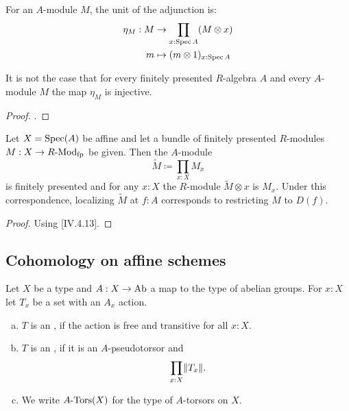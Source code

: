 For an $A$-module $M$,
the unit of the adjunction is:
\begin{align*}
  \eta_M : M &\to \prod_{x : \operatorname{Spec} A} (M \otimes x) \\
  m &\mapsto (m \otimes 1)_{x : \operatorname{Spec} A}
\end{align*}

\begin{example}
  It is not the case that
  for every finitely presented $R$-algebra $A$
  and every $A$-module $M$
  the map $\eta_M$ is injective.
\end{example}

\begin{proof}
  \cite{topology-draft}.
\end{proof}

\begin{theorem}%
  \label{fp-module}
  Let $X=\operatorname{Spec}(A)$ be affine and
  let a bundle of finitely presented $R$-modules $M : X\to R\text{-}\mathrm{Mod}_{\text{fp}}$ be given.
  Then the $A$-module
  \[ \tilde{M}\coloneqq\prod_{x:X}M_x \]
  is finitely presented and for any $x:X$ the $R$-module $\tilde{M}\otimes x$ is $M_x$.
  Under this correspondence, localizing $\tilde{M}$ at $f:A$ corresponds to restricting $M$ to $D(f)$.
\end{theorem}

\begin{proof}
  Using \cite{lombardi-quitte}[IV.4.13].
\end{proof}

\subsection{Cohomology on affine schemes}

\begin{definition}%
  \label{torsor}
  Let $X$ be a type and $A:X\to \operatorname{Ab}$ a map to the type of abelian groups.
  For $x:X$ let $T_x$ be a set with an $A_x$ action.
  \begin{enumerate}[(a)]
  \item $T$ is an , if the action is free and transitive for all $x:X$.
  \item $T$ is an , if it is an $A$-pseudotorsor and
    \[ \prod_{x:X} \propTrunc{ T_x } \rlap{.}\]
  \item We write $A\text{-}\mathrm{Tors}(X)$ for the type of $A$-torsors on $X$.
  \end{enumerate}
\end{definition}


